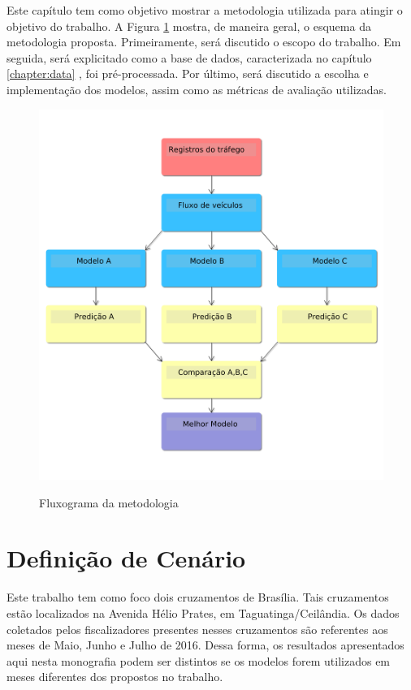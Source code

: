 \label{chapter:methodology}
Este capítulo tem como objetivo mostrar a metodologia utilizada para atingir o objetivo do trabalho. A Figura \ref{figure:metodologia} mostra, de maneira geral, o esquema da metodologia proposta. Primeiramente, será discutido o escopo do trabalho. Em seguida, será explicitado como a base de dados, caracterizada no capítulo \ref{chapter:data} , foi pré-processada. Por último, será discutido a escolha e implementação dos modelos, assim como as métricas de avaliação utilizadas.

\begin{figure}
    \centering
    \includegraphics[scale=0.4]{monography/img/tccFlux.png}
    \label{figure:metodologia}
    \caption[Fluxograma da metodologia]{Fluxograma da metodologia}
\end{figure}

\section{Definição de Cenário}

Este trabalho tem como foco dois cruzamentos de Brasília. Tais cruzamentos estão localizados na Avenida Hélio Prates, em Taguatinga/Ceilândia. Os dados coletados pelos fiscalizadores presentes nesses cruzamentos são referentes aos meses de Maio, Junho e Julho de 2016. Dessa forma, os resultados apresentados aqui nesta monografia podem ser distintos se os modelos forem utilizados em meses diferentes dos propostos no trabalho.

